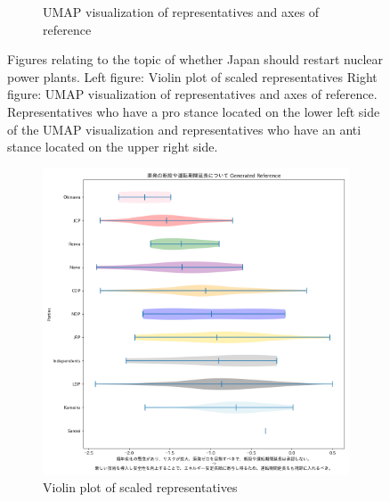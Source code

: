\documentclass[final,5p,times,twocolumn,authoryear]{elsarticle}
\begin{document}
\begin{figure}[h]
\begin{subfigure}{0.22\textwidth}
      \caption{UMAP visualization of representatives and axes of reference}
    \end{subfigure}
\caption{Figures relating to the topic of whether Japan should restart nuclear power plants. Left figure: Violin plot of scaled representatives Right figure: UMAP visualization of representatives and axes of reference. Representatives who have a pro stance located on the lower left side of the UMAP visualization and representatives who have an anti stance located on the upper right side.}
\label{fig: restarting-nuclear}
\end{figure}

\begin{figure}[h]
\centering
    \begin{subfigure}{0.22\textwidth}
      \centering
      \includegraphics[width=1\linewidth]{figs/results/nuclear/buildingnew_gen_violin_plot.png}
      \caption{Violin plot of scaled representatives}
    \end{subfigure}
    \begin{subfigure}{0.22\textwidth}
      \centering

\end{subfigure}
\end{figure}
\end{document}
